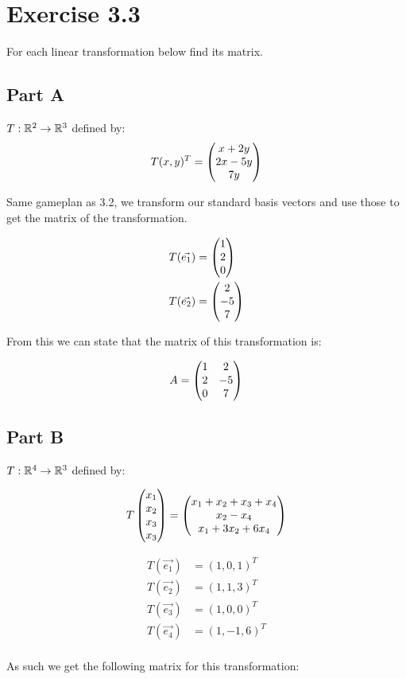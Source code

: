 \section*{Exercise 3.3}
For each linear transformation below find its matrix.

\subsection*{Part A}
$T: \R^2 \to \R^3$ defined by:
\[T(x,y)^T = \genericmat{p}{x+2y\\2x-5y\\7y}\]

Same gameplan as 3.2, we transform our standard basis vectors and use those to get the matrix of the transformation.

\[
	\begin{aligned}
		T(\vec{e_1}) &= \genericmat{p}{1\\2\\0} \\
		T(\vec{e_2}) &= \genericmat{p}{2\\-5\\7}
	\end{aligned}
\]

From this we can state that the matrix of this transformation is:

\[A = \genericmat{p}{1&2\\2&-5\\0&7}\]

\subsection*{Part B}
$T: \R^4 \to \R^3$ defined by:

\[
	T \genericmat{p}{x_1\\x_2\\x_3\\x_3} = 
	\genericmat{p}
	{x_1+x_2+x_3+x_4 \\ 
	x_2 - x_4 \\ 
	x_1 + 3x_2 + 
	6x_4}
\]

\[
	\begin{aligned}
		T(\vec{e_1}) &= (1,0,1)^T \\
		T(\vec{e_2}) &= (1,1,3)^T \\
		T(\vec{e_3}) &= (1,0,0)^T \\
		T(\vec{e_4}) &= (1,-1,6)^T \\
	\end{aligned}
\]

As such we get the following matrix for this transformation:

